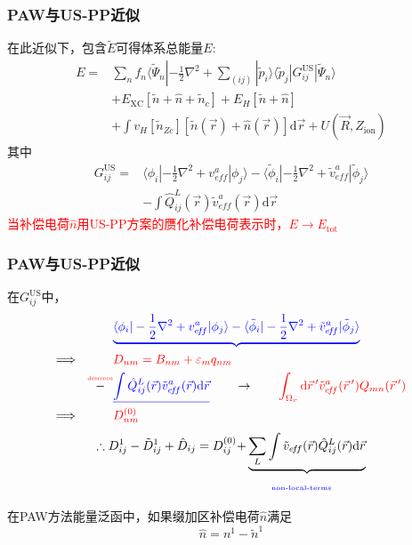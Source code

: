 \documentclass[cjk,slidestop,compress,mathserif,blue]{beamer}
\begin{document}
\frame
{
	\frametitle{\textrm{PAW}与\textrm{US-PP}近似}
	在此近似下，包含$\tilde E$可得体系总能量$E$:
	\begin{displaymath}
		\begin{aligned}
			E=&\sum_nf_n\langle\tilde\Psi_n|-\frac12\nabla^2+\sum_{(ij)}|\tilde p_i\rangle\langle\tilde p_j|G_{ij}^{\mathrm{US}}|\tilde\Psi_n\rangle\\
			&+E_{\mathrm{XC}}[\tilde n+\hat n+\tilde n_c]+E_H[\tilde n+\hat n]\\
			&+\int v_H[\tilde n_{Zc}][\tilde n(\vec r)+\hat n(\vec r)]\mathrm{d}\vec r+U(\vec R,Z_{\mathrm{ion}})
		\end{aligned}
	\end{displaymath}
	其中
	\begin{displaymath}
		\begin{aligned}
			G_{ij}^{\mathrm{US}}=&\langle\phi_i|-\frac12\nabla^2+v_{e\!f\!f}^a|\phi_j\rangle-\langle\tilde\phi_i|-\frac12\nabla^2+\tilde v_{e\!f\!f}^a|\tilde\phi_j\rangle\\
			&-\int\hat Q_{ij}^L(\vec r)\tilde v_{e\!f\!f}^a(\vec r)\mathrm{d}\vec r
		\end{aligned}
	\end{displaymath}
	\textcolor{red}{当补偿电荷$\hat n$用\textrm{US-PP}方案的赝化补偿电荷表示时，$E\rightarrow E_{\mathrm{tot}}$}
}

\frame
{
	\frametitle{\textrm{PAW}与\textrm{US-PP}近似}
	在$G_{ij}^{\mathrm{US}}$中，
	\begin{displaymath}
		\begin{aligned}
			&\textcolor{blue}{\underbrace{\langle\phi_i|-\frac12\nabla^2+v_{e\!f\!f}^a|\phi_j\rangle-\langle\tilde\phi_i|-\frac12\nabla^2+\tilde v_{e\!f\!f}^a|\tilde\phi_j\rangle}}\\
			\Longrightarrow\quad\qquad&\textcolor{red}{D_{nm}=B_{nm}+\varepsilon_mq_{nm}} \\
			\overset{\textcolor{red}{\textrm{\fontsize{4.1pt}{3.9pt}\selectfont{desrceen}}}}{-}&\textcolor{blue}{\underline{\int\hat Q_{ij}^L(\vec r)\tilde v_{e\!f\!f}^a(\vec r)\mathrm{d}\vec r}} \qquad\rightarrow\qquad \textcolor{red}{\int_{\Omega_r}\mathrm{d}\vec r\,^{\prime}\tilde v_{e\!f\!f}^a(\vec r\,^{\prime})Q_{mn}(\vec r\,^{\prime})}\\
			\Longrightarrow\quad\qquad&\textcolor{red}{D_{nm}^{(0)}}
		\end{aligned}
	\end{displaymath}
	\begin{displaymath}
		\begin{aligned}
			\therefore D_{ij}^1-\tilde D_{ij}^1+\hat D_{ij}=D_{ij}^{(0)}+&\underbrace{\sum_L\int\tilde v_{e\!f\!f}(\vec r)\hat{Q}_{ij}^L(\vec r)\mathrm{d}\vec r}\\
			&\qquad{\textcolor{blue}{\fontsize{5.2pt}{4.2pt}\selectfont{\textrm{non-local-terms}}}}
		\end{aligned}
	\end{displaymath}

	在\textrm{PAW}方法能量泛函中，如果缀加区补偿电荷$\hat n$满足$$\hat n=n^1-\tilde n^1$$
}
\end{document}
